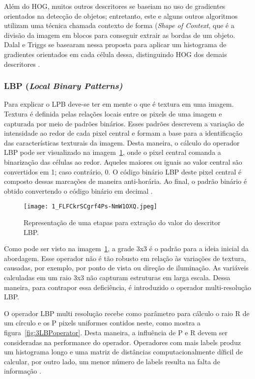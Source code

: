 \documentclass[12pt]{article}
\begin{document}
Além do HOG, muitos outros descritores se baseiam no uso de gradientes orientados na detecção de objetos; entretanto, este e alguns outros algoritmos utilizam uma técnica chamada contexto de forma (\textit{Shape of Context}, que é a divisão da imagem em blocos para conseguir extrair as bordas de um objeto. Dalal e Triggs se basearam nessa proposta para aplicar um histograma de gradientes orientados em cada célula dessa, distinguindo HOG dos demais descritores \cite{DilermandoErick2022}.

\subsubsection{LBP (\textit{Local Binary Patterns)}}
Para explicar o LPB deve-se ter em mente o que é textura em uma imagem. Textura é definida pelas relações locais entre os pixels de uma imagem e capturada por meio de padrões binários. Esses padrões descrevem a variação de intensidade ao redor de cada pixel central e formam a base para a identificação das características texturais da imagem. Desta maneira, o cálculo do operador LBP pode ser visualizado na imagem~\ref{fig:LBPembedding}, onde o pixel central comanda a binarização das células ao redor. Aqueles maiores ou iguais ao valor central são convertidos em 1; caso contrário, 0. O código binário LBP deste pixel central é composto dessas marcações de maneira anti-horária. Ao final, o padrão binário é obtido convertendo o código binário em decimal \cite{LBP}\cite{FaceRocgnition}.

\begin{figure}[H]
    \centering
    \texttt{[image: 1\_FLFCkrSCgrf4Ps-NmW1OXQ.jpeg]}
    \caption{Representação de uma etapas para extração do valor do descritor LBP.}
    \label{fig:LBPembedding}
\end{figure}

Como pode ser visto na imagem~\ref{fig:LBPembedding}, a grade 3x3 é o padrão para a ideia inicial da abordagem. Esse operador não é tão robusto em relação às variações de textura, causadas, por exemplo, por ponto de vista ou direção de iluminação. As variáveis calculadas em um raio 3x3 não capturam estruturas em larga escala. Dessa maneira, para contrapor essa deficiência, é introduzido o operador multi-resolução LBP.

O operador LBP multi resolução \cite{LBP} recebe como  parâmetro para cálculo o raio R de um círculo e os P pixels uniformes contidos neste, como mostra a figura~\ref{fig:3LBPoperator}. Desta maneira, a influência de P e R devem ser consideradas na performance do operador. Operadores com mais labels produz um histograma longo e uma matriz de distâncias computacionalmente díficil de calcular, por outro lado, um menor número de labels resulta na falta de informação \cite{FaceRocgnition}.
\end{document}
